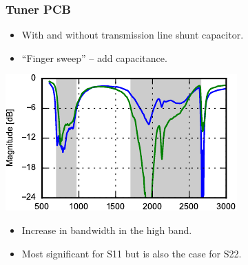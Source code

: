 \begin{frame}
  \frametitle{Tuner PCB}
  \begin{itemize}
  \item With and without transmission line shunt capacitor.
  \item ``Finger sweep'' -- add capacitance.
  \end{itemize}
\begin{center}
    \includegraphics[scale=1.4]{img/Lasse/tuner_pcb/003_s11top.pdf}
\end{center}
\begin{itemize}
\item Increase in bandwidth in the high band.
\item Most significant for S11 but is also the case for S22. 
\end{itemize}
\legendfooter
\end{frame}

